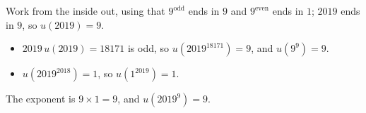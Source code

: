 Work from the inside out, using that $9^{\text{odd}}$ ends in $9$ and $9^{\text{even}}$ ends in $1$; $2019$ ends in $9$, so $u(2019)=9$.
\begin{itemize}
\item $2019\,u(2019)=18171$ is odd, so $u\left(2019^{18171}\right)=9$, and $u\left(9^9\right)=9$.
\item $u\left(2019^{2018}\right)=1$, so $u\left(1^{2019}\right)=1$.
\end{itemize}
The exponent is $9\times1=9$, and $u\left(2019^9\right)=\boxed{9}$.
